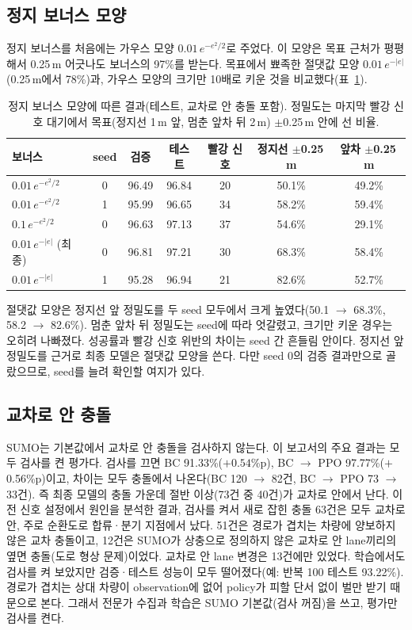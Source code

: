 \documentclass[10pt,a4paper]{article}
\begin{document}
\subsection{정지 보너스 모양}\label{sec:stopshape}
정지 보너스를 처음에는 가우스 모양 $0.01\,e^{-e^2/2}$로 주었다. 이 모양은 목표 근처가 평평해서 0.25\,m 어긋나도 보너스의 97\%를 받는다. 목표에서 뾰족한 절댓값 모양 $0.01\,e^{-|e|}$(0.25\,m에서 78\%)과, 가우스 모양의 크기만 10배로 키운 것을 비교했다(표~\ref{tab:stopshape}).
\begin{table}[h]
\centering
\caption{정지 보너스 모양에 따른 결과(테스트, 교차로 안 충돌 포함). 정밀도는 마지막 빨강 신호 대기에서 목표(정지선 1\,m 앞, 멈춘 앞차 뒤 2\,m) $\pm$0.25\,m 안에 선 비율.}
\label{tab:stopshape}
\small
\begin{tabular}{@{}lcccccc@{}}
\toprule
보너스 & seed & 검증 & 테스트 & 빨강 신호 & 정지선 $\pm$0.25\,m & 앞차 $\pm$0.25\,m \\
\midrule
$0.01\,e^{-e^2/2}$ & 0 & 96.49 & 96.84 & 20 & 50.1\% & 49.2\% \\
$0.01\,e^{-e^2/2}$ & 1 & 95.99 & 96.65 & 34 & 58.2\% & 59.4\% \\
$0.1\,e^{-e^2/2}$ & 0 & 96.63 & 97.13 & 37 & 54.6\% & 29.1\% \\
$0.01\,e^{-|e|}$ (최종) & 0 & 96.81 & 97.21 & 30 & 68.3\% & 58.4\% \\
$0.01\,e^{-|e|}$ & 1 & 95.28 & 96.94 & 21 & 82.6\% & 52.7\% \\
\bottomrule
\end{tabular}
\end{table}
절댓값 모양은 정지선 앞 정밀도를 두 seed 모두에서 크게 높였다(50.1 $\rightarrow$ 68.3\%, 58.2 $\rightarrow$ 82.6\%). 멈춘 앞차 뒤 정밀도는 seed에 따라 엇갈렸고, 크기만 키운 경우는 오히려 나빠졌다. 성공률과 빨강 신호 위반의 차이는 seed 간 흔들림 안이다. 정지선 앞 정밀도를 근거로 최종 모델은 절댓값 모양을 쓴다. 다만 seed 0의 검증 결과만으로 골랐으므로, seed를 늘려 확인할 여지가 있다.

\subsection{교차로 안 충돌}\label{sec:junction}
SUMO는 기본값에서 교차로 안 충돌을 검사하지 않는다. 이 보고서의 주요 결과는 모두 검사를 켠 평가다. 검사를 끄면 BC 91.33\%(${+}0.54$\%p), BC $\rightarrow$ PPO 97.77\%(${+}$0.56\%p)이고, 차이는 모두 충돌에서 나온다(BC 120 $\rightarrow$ 82건, BC $\rightarrow$ PPO 73 $\rightarrow$ 33건). 즉 최종 모델의 충돌 가운데 절반 이상(73건 중 40건)가 교차로 안에서 난다.
이전 신호 설정에서 원인을 분석한 결과, 검사를 켜서 새로 잡힌 충돌 63건은 모두 교차로 안, 주로 순환도로 합류·분기 지점에서 났다. 51건은 경로가 겹치는 차량에 양보하지 않은 교차 충돌이고, 12건은 SUMO가 상충으로 정의하지 않은 교차로 안 lane끼리의 옆면 충돌(도로 형상 문제)이었다. 교차로 안 lane 변경은 13건에만 있었다.
학습에서도 검사를 켜 보았지만 검증·테스트 성능이 모두 떨어졌다(예: 반복 100 테스트 93.22\%). 경로가 겹치는 상대 차량이 observation에 없어 policy가 피할 단서 없이 벌만 받기 때문으로 본다. 그래서 전문가 수집과 학습은 SUMO 기본값(검사 꺼짐)을 쓰고, 평가만 검사를 켠다.
\end{document}
